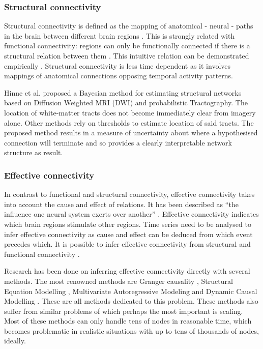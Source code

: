 \documentclass[a4paper, 10pt, english, onecolumn]{article}
\begin{document}
\subsubsection*{Structural connectivity}
Structural connectivity is defined as the mapping of anatomical - neural - paths in the brain between different brain regions \cite{friston1994}.
This is strongly related with functional connectivity: regions can only be functionally connected if there is a structural relation between them \cite{cabral2012}.
This intuitive relation can be demonstrated empirically \cite{vandenheuvel2009}.
Structural connectivity is less time dependent as it involves mappings of anatomical connections opposing temporal activity patterns.

Hinne et al. \cite{hinne2013} proposed a Bayesian method for estimating structural networks based on Diffusion Weighted MRI (DWI) and probabilistic Tractography.
The location of white-matter tracts does not become immediately clear from imagery alone.
Other methods rely on thresholds to estimate location of said tracts.
The proposed method results in a measure of uncertainty about where a hypothesised connection will terminate and so provides a clearly interpretable network structure as result.

\subsubsection*{Effective connectivity}
In contrast to functional and structural connectivity, effective connectivity takes into account the cause and effect of relations.
It has been described as ``the influence one neural system exerts over another'' \cite{friston1994}.
Effective connectivity indicates which brain regions stimulate other regions.
Time series need to be analysed to infer effective connectivity as cause and effect can be deduced from which event precedes which. 
It is possible to infer effective connectivity from structural and functional connectivity \cite{mclntosh1994, harrison2003, friston2003, roebroeck2005}.

Research has been done on inferring effective connectivity directly with several methods.
The most renowned methods are Granger causality \cite{roebroeck2005}, Structural Equation Modelling \cite{mclntosh1994}, Multivariate Autoregressive Modeling \cite{harrison2003} and Dynamic Causal Modelling \cite{friston2003}.
These are all methods dedicated to this problem.
These methods also suffer from similar problems of which perhaps the most important is scaling.
Most of these methods can only handle tens of nodes in reasonable time, which becomes problematic in realistic situations with up to tens of thousands of nodes, ideally.
\end{document}
